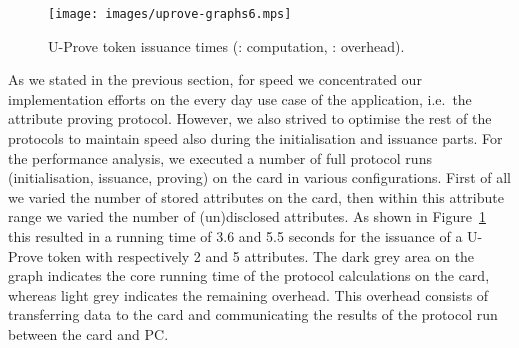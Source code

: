 \begin{figure}
  \centering
  \texttt{[image: images/uprove-graphs6.mps]}
  \caption[U-Prove token issuance times.]{
    U-Prove token issuance times
    (: computation,
      : overhead).}
  \label{fig:issue}
\end{figure}

As we stated in the previous section, for speed we concentrated our
implementation efforts on the every day use case of the application, i.e.\ the
attribute proving protocol. However, we also strived to optimise the rest of the
protocols to maintain speed also during the initialisation and issuance parts.
For the performance analysis, we executed a number of full protocol runs
(initialisation, issuance, proving) on the card in various configurations. First
of all we varied the number of stored attributes on the card, then within this
attribute range we varied the number of (un)disclosed attributes. As shown in
Figure~\ref{fig:issue} this resulted in a running time of 3.6 and 5.5 seconds
for the issuance of a U-Prove token with respectively 2 and 5 attributes.
The dark grey area on the graph indicates the core running time of the protocol
calculations on the card, whereas light grey indicates the remaining overhead.
This overhead consists of transferring data to the card and communicating the
results of the protocol run between the card and PC.

